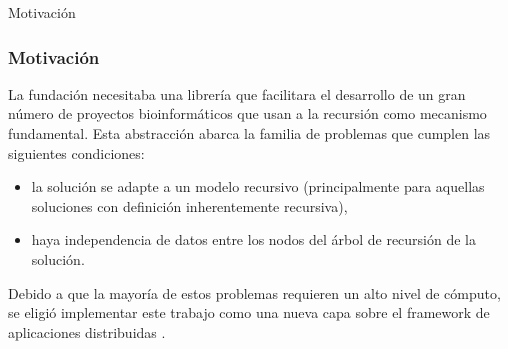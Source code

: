 \begin{subsection}{Motivación}

\begin{frame}\frametitle{Motivación}
    La fundación necesitaba una librería que facilitara el desarrollo de un gran número de proyectos bioinformáticos que usan a la
    recursión como mecanismo fundamental. Esta abstracción abarca la familia de problemas que cumplen las siguientes condiciones:\\[0.2cm]
    \begin{itemize}
        \item   la solución se adapte a un modelo recursivo (principalmente para aquellas soluciones con definición inherentemente
                recursiva),
        \item   haya independencia de datos entre los nodos del árbol de recursión de la solución.
    \end{itemize}

    \pause
    \begin{block}{}
        Debido a que la mayoría de estos problemas requieren un alto nivel de cómputo, se eligió implementar este trabajo como una
        nueva capa sobre el framework de aplicaciones distribuidas \fud.
    \end{block}
\end{frame}

\end{subsection}

